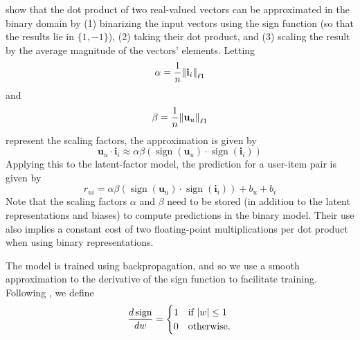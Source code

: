 \documentclass[sigchi]{acmart}
\DeclareMathOperator{\sign}{sign}
\renewcommand\vec{\mathbf}
\begin{document}
\citet{rastegari2016xnor} show that the dot product of two real-valued vectors can be approximated in the binary domain by (1) binarizing the input vectors using the sign function (so that the results lie in $\{1, -1\}$), (2) taking their dot product, and (3) scaling the result by the average magnitude of the vectors' elements. Letting
\begin{equation}
\alpha = \frac{1}{n}\norm{\vec{i}_{i}}_{\ell1}
\end{equation}
and
\begin{equation}
\beta = \frac{1}{n}\norm{\vec{u}_{u}}_{\ell1}
\end{equation}
represent the scaling factors, the approximation is given by
\newcommand\binaryApproximation{ \alpha \beta\left(\sign(\vec{u}_u) \cdot \sign(\vec{i}_i)\right)}
\begin{equation}
\vec{u}_u \cdot \vec{i}_i \approx \binaryApproximation
\end{equation}
Applying this to the latent-factor model, the prediction for a user-item pair is given by
\begin{equation}
r_{ui} = \binaryApproximation + b_u + b_i
\end{equation}
Note that the scaling factors $\alpha$ and $\beta$ need to be stored (in addition to the latent representations and biases) to compute predictions in the binary model. Their use also implies a constant cost of two floating-point multiplications per dot product when using binary representations.

The model is trained using backpropagation, and so we use a smooth approximation to the derivative of the sign function to facilitate training. Following \citet{courbariaux2016binarized}, we define
\begin{equation}
  \frac{d\sign}{dw}=
  \begin{cases}
    1 & \text{if}\ \abs{w} \leq 1 \\
    0 & \text{otherwise}.
  \end{cases}
\end{equation}
\end{document}
